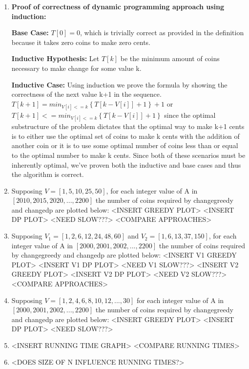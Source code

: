 \documentclass[paper=a4, fontsize=11pt]{scrartcl} %
\numberwithin{equation}{section} %
\numberwithin{figure}{section} %
\numberwithin{table}{section} %
\begin{document}
\begin{enumerate}
    \item \textbf{Proof of correctness of dynamic programming approach using induction:}
    
    \textbf{Base Case:} $T[0] = 0$, which is trivially correct as provided in the definition because it takes zero coins to make zero cents.
    
    \textbf{Inductive Hypothesis:} Let $T[k]$ be the minimum amount of coins necessary to make change for some value k.
    
    \textbf{Inductive Case:} Using induction we prove the formula by showing the correctness of the next value k+1 in the sequence. $T[k+1] = min_{V[i]<=k}\left\{T[k - V[i]] + 1\right\} + 1$ or $T[k+1] <= min_{V[i]<=k}\left\{T[k - V[i]] + 1\right\}$ since the optimal substructure of the problem dictates that the optimal way to make k+1 cents is to either use the optimal set of coins to make k cents with the addition of another coin or it is to use some optimal number of coins less than or equal to the optimal number to make k cents. Since both of these scenarios must be inherently optimal, we've proven both the inductive and base cases and thus the algorithm is correct.
    
    \item Supposing $V = [1, 5, 10, 25, 50]$, for each integer value of A in $[2010, 2015, 2020, ..., 2200]$ the number of coins required by changegreedy and changedp are plotted below: <INSERT GREEDY PLOT> <INSERT DP PLOT> <NEED SLOW???> <COMPARE APPROACHES>
    
    \item Supposing $V_1 = [1, 2, 6, 12, 24, 48, 60]$ and $V_2 = [1, 6, 13, 37, 150]$, for each integer value of A in $[2000, 2001, 2002, ..., 2200]$ the number of coins required by changegreedy and changedp are plotted below: <INSERT V1 GREEDY PLOT> <INSERT V1 DP PLOT> <NEED V1 SLOW???> <INSERT V2 GREEDY PLOT> <INSERT V2 DP PLOT> <NEED V2 SLOW???> <COMPARE APPROACHES>
    
    \item Supposing $V = [1, 2, 4, 6, 8, 10, 12, ..., 30]$ for each integer value of A in $[2000, 2001, 2002, ..., 2200]$ the number of coins required by changegreedy and changedp are plotted below: <INSERT GREEDY PLOT> <INSERT DP PLOT> <NEED SLOW???>
    
    \item <INSERT TREND LINE EQUATIONS AND FIND RUNTIME> <INSERT RUNNING TIME GRAPH> <COMPARE RUNNING TIMES>
    
    \item <PLOT RUNNING TIMES AS FUNCTION OF NUMBER OF DENOMINATIONS> <DOES SIZE OF N INFLUENCE RUNNING TIMES?>
    

\end{enumerate}
\end{document}

